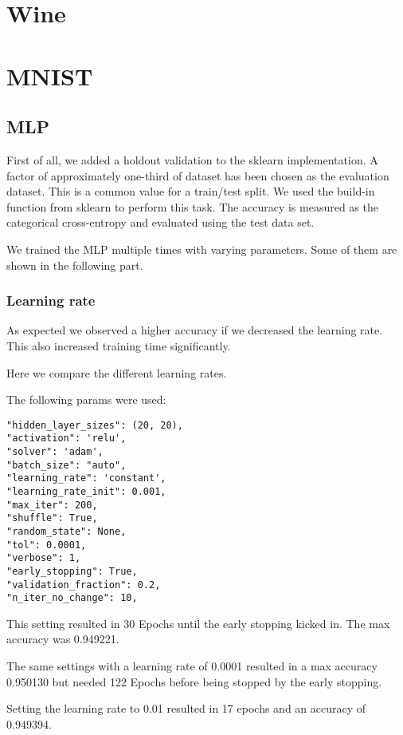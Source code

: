 \documentclass[a4paper, 11pt]{article}
\begin{document}
\section{Wine}



\section{MNIST}
\subsection{MLP}
First of all, we added a holdout validation to the sklearn implementation.
A factor of approximately one-third of dataset has been chosen as the evaluation dataset.
This is a common value for a train/test split. We used the build-in function from sklearn to perform this task.
The accuracy is measured as the categorical cross-entropy and evaluated using the test data set.

We trained the MLP multiple times with varying parameters.
Some of them are shown in the following part.

\subsubsection{Learning rate} \label{mnist_lr}
As expected we observed a higher accuracy if we decreased the learning rate.
This also increased training time significantly.

Here we compare the different learning rates.

The following params were used:

\begin{verbatim}
"hidden_layer_sizes": (20, 20),
"activation": 'relu',
"solver": 'adam',
"batch_size": "auto",
"learning_rate": 'constant',
"learning_rate_init": 0.001,
"max_iter": 200,
"shuffle": True,
"random_state": None,
"tol": 0.0001,
"verbose": 1,
"early_stopping": True,
"validation_fraction": 0.2,
"n_iter_no_change": 10,
\end{verbatim}

This setting resulted in 30 Epochs until the early stopping kicked in.
The max accuracy was 0.949221.

The same settings with a learning rate of 0.0001 resulted in a max accuracy 0.950130 but needed 122 Epochs before being stopped by the early stopping.

Setting the learning rate to 0.01 resulted in 17 epochs and an accuracy of 0.949394.
\end{document}
